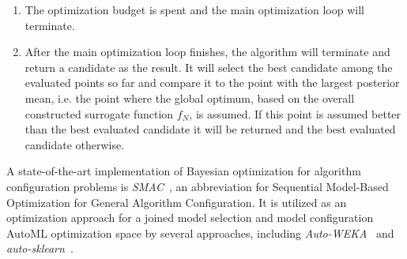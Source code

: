 \begin{enumerate}
    \item The optimization budget is spent and the main optimization loop will terminate.
    \item After the main optimization loop finishes, the algorithm will terminate and return a candidate as the result.
    It will select the best candidate among the evaluated points so far and compare it to the point with the largest posterior mean, i.e. the point where the global optimum, based on the overall constructed surrogate function $f_N$, is assumed.
    If this point is assumed better than the best evaluated candidate it will be returned and the best evaluated candidate otherwise.
\end{enumerate}
A state-of-the-art implementation of Bayesian optimization for algorithm configuration problems is \textit{SMAC}~\cite{Hutter-SMAC}, an abbreviation for Sequential Model-Based Optimization for General Algorithm Configuration.
It is utilized as an optimization approach for a joined model selection and model configuration AutoML optimization space by several approaches, including \textit{Auto-WEKA}~\cite{Thornton-AutoWeka} and \textit{auto-sklearn}~\cite{Feurer-AutoSklearn}.

